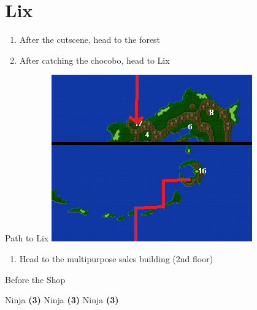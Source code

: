 \chapter{Lix}

\vspace{\baselineskip}

\begin{paracol}{2}

\begin{enumerate}
    \item After the cutscene, head to the forest
    \item After catching the chocobo, head to Lix
\end{enumerate}

\switchcolumn
\begin{misc}{Path to Lix}
    \includegraphics[scale=1.45]{../Graphics/Maps/3. To Lix.png}
\end{misc}

\switchcolumn
\resume
\begin{enumerate}[resume]
    \item Head to the multipurpose sales building (2nd floor)
\end{enumerate}

\begin{menu}{Before the Shop}
    \varwb
    \begin{jobMenu}
        \lenna Ninja \textbf{(3\pointRight)} \ability{!\black}
        \galuf Ninja \textbf{(3\pointRight)} \ability{!\observe}
        \faris Ninja \textbf{(3\pointRight)} \ability{!\black}
    \end{jobMenu}
    \varwe
\end{menu}


\end{paracol}
